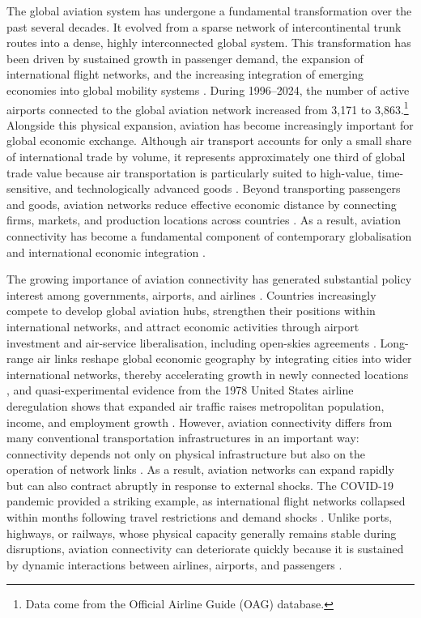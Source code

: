The global aviation system has undergone a fundamental transformation over
the past several decades. It evolved from a sparse network of
intercontinental trunk routes into a dense, highly interconnected global
system. This transformation has been driven by sustained growth in passenger
demand, the expansion of international flight networks, and the increasing
integration of emerging economies into global mobility systems
\citep{Liao_2026,OKelly_2026}. During 1996--2024, the number of active airports connected to the global aviation network increased from 3{,}171 to 3{,}863.\footnote{Data come from the Official Airline Guide (OAG) database.}
Alongside this physical expansion, aviation has become increasingly important
for global economic exchange. Although air transport accounts for only a
small share of international trade by volume, it represents approximately one
third of global trade value because air transportation is particularly suited
to high-value, time-sensitive, and technologically advanced goods
\citep{IATA_cargo}. Beyond transporting passengers and goods, aviation
networks reduce effective economic distance by connecting firms, markets, and
production locations across countries \citep{Lenaerts_2021}. As a result,
aviation connectivity has become a fundamental component of contemporary
globalisation and international economic integration \citep{Zhang_2026}.

The growing importance of aviation connectivity has generated substantial
policy interest among governments, airports, and airlines \citep{Adler_2014}.
Countries increasingly compete to develop global aviation hubs, strengthen
their positions within international networks, and attract economic
activities through airport investment and air-service liberalisation,
including open-skies agreements \citep{Gillen_2002,Burghouwt_2015}.
Long-range air links reshape global economic geography by integrating cities
into wider international networks, thereby accelerating growth in newly
connected locations \citep{Campante_2017}, and quasi-experimental evidence
from the 1978 United States airline deregulation shows that expanded air
traffic raises metropolitan population, income, and employment growth
\citep{Blonigen_2015}. However, aviation connectivity
differs from many conventional transportation infrastructures in an important
way: connectivity depends not only on physical infrastructure but also on the
operation of network links \citep{Wandelt_2025}. As a result, aviation
networks can expand rapidly but can also contract abruptly in response to
external shocks. The COVID-19 pandemic provided a striking example, as
international flight networks collapsed within months following travel
restrictions and demand shocks \citep{Sun_2021}. Unlike ports, highways, or
railways, whose physical capacity generally remains stable during
disruptions, aviation connectivity can deteriorate quickly because it is
sustained by dynamic interactions between airlines, airports, and passengers
\citep{Zhou_2021}.

